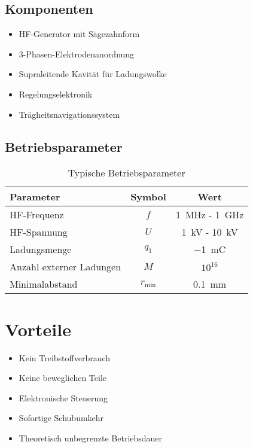 \documentclass[11pt, a4paper]{article}
\begin{document}
\subsection{Komponenten}

\begin{itemize}
    \item HF-Generator mit Sägezahnform
    \item 3-Phasen-Elektrodenanordnung
    \item Supraleitende Kavität für Ladungswolke
    \item Regelungselektronik
    \item Trägheitsnavigationssystem
\end{itemize}

\subsection{Betriebsparameter}

\begin{table}[ht]
\centering
\begin{tabular}{lcc}
\toprule
Parameter & Symbol & Wert \\
\midrule
HF-Frequenz & $f$ & \SI{1}{\mega\hertz} - \SI{1}{\giga\hertz} \\
HF-Spannung & $U$ & \SI{1}{\kilo\volt} - \SI{10}{\kilo\volt} \\
Ladungsmenge & $q_1$ & \SI{-1}{\milli\coulomb} \\
Anzahl externer Ladungen & $M$ & $10^{16}$ \\
Minimalabstand & $r_{\text{min}}$ & \SI{0.1}{\milli\meter} \\
\bottomrule
\end{tabular}
\caption{Typische Betriebsparameter}
\end{table}

\section{Vorteile}

\begin{itemize}
    \item Kein Treibstoffverbrauch
    \item Keine beweglichen Teile
    \item Elektronische Steuerung
    \item Sofortige Schubumkehr
    \item Theoretisch unbegrenzte Betriebsdauer
\end{itemize}
\end{document}
